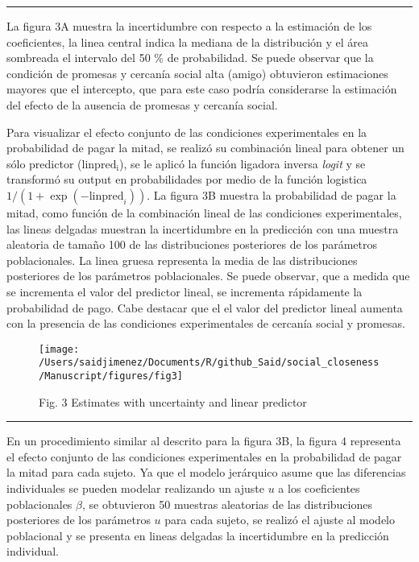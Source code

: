\documentclass[]{article}
\begin{document}
\begin{center}\rule{0.5\linewidth}{\linethickness}\end{center}

La figura 3A muestra la incertidumbre con respecto a la estimación de
los coeficientes, la linea central indica la mediana de la distribución
y el área sombreada el intervalo del 50 \% de probabilidad. Se puede
observar que la condición de promesas y cercanía social alta (amigo)
obtuvieron estimaciones mayores que el intercepto, que para este caso
podría considerarse la estimación del efecto de la ausencia de promesas
y cercanía social.

Para visualizar el efecto conjunto de las condiciones experimentales en
la probabilidad de pagar la mitad, se realizó su combinación lineal para
obtener un sólo predictor (\(\mathrm{linpred_i}\)), se le aplicó la
función ligadora inversa \emph{logit} y se transformó su output en
probabilidades por medio de la función logistica
\(1 / (1 + \exp(-\mathrm{linpred}_i))\). La figura 3B muestra la
probabilidad de pagar la mitad, como función de la combinación lineal de
las condiciones experimentales, las lineas delgadas muestran la
incertidumbre en la predicción con una muestra aleatoria de tamaño 100
de las distribuciones posteriores de los parámetros poblacionales. La
linea gruesa representa la media de las distribuciones posteriores de
los parámetros poblacionales. Se puede observar, que a medida que se
incrementa el valor del predictor lineal, se incrementa rápidamente la
probabilidad de pago. Cabe destacar que el el valor del predictor lineal
aumenta con la presencia de las condiciones experimentales de cercanía
social y promesas.

\begin{figure}

{\centering \texttt{[image: /Users/saidjimenez/Documents/R/github\_Said/social\_closeness/Manuscript/figures/fig3]} 

}

\caption{Fig. 3 Estimates with uncertainty and linear predictor}\label{fig:fig3}
\end{figure}

\begin{center}\rule{0.5\linewidth}{\linethickness}\end{center}

En un procedimiento similar al descrito para la figura 3B, la figura 4
representa el efecto conjunto de las condiciones experimentales en la
probabilidad de pagar la mitad para cada sujeto. Ya que el modelo
jerárquico asume que las diferencias individuales se pueden modelar
realizando un ajuste \(u\) a los coeficientes poblacionales \(\beta\),
se obtuvieron 50 muestras aleatorias de las distribuciones posteriores
de los parámetros \(u\) para cada sujeto, se realizó el ajuste al modelo
poblacional y se presenta en lineas delgadas la incertidumbre en la
predicción individual.
\end{document}
